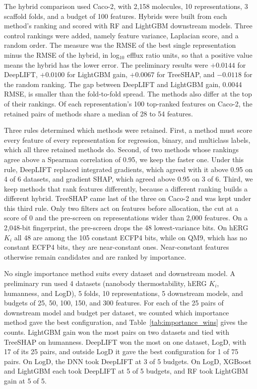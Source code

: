 The hybrid comparison used Caco-2, with 2,158 molecules, 10 representations, 3 scaffold folds, and a budget of 100 features. Hybrids were built from each method's ranking and scored with RF and LightGBM downstream models. Three control rankings were added, namely feature variance, Laplacian score, and a random order. The measure was the RMSE of the best single representation minus the RMSE of the hybrid, in log$_{10}$ efflux ratio units, so that a positive value means the hybrid has the lower error. The preliminary results were $+0.0144$ for DeepLIFT, $+0.0100$ for LightGBM gain, $+0.0067$ for TreeSHAP, and $-0.0118$ for the random ranking. The gap between DeepLIFT and LightGBM gain, 0.0044 RMSE, is smaller than the fold-to-fold spread. The methods also differ at the top of their rankings. Of each representation's 100 top-ranked features on Caco-2, the retained pairs of methods share a median of 28 to 54 features.

Three rules determined which methods were retained. First, a method must score every feature of every representation for regression, binary, and multiclass labels, which all three retained methods do. Second, of two methods whose rankings agree above a Spearman correlation of 0.95, we keep the faster one. Under this rule, DeepLIFT replaced integrated gradients, which agreed with it above 0.95 on 4 of 6 datasets, and gradient SHAP, which agreed above 0.95 on 3 of 6. Third, we keep methods that rank features differently, because a different ranking builds a different hybrid. TreeSHAP came last of the three on Caco-2 and was kept under this third rule. Only two filters act on features before allocation, the cut at a score of 0 and the pre-screen on representations wider than 2,000 features. On a 2,048-bit fingerprint, the pre-screen drops the 48 lowest-variance bits. On hERG $K_i$ all 48 are among the 105 constant ECFP4 bits, while on QM9, which has no constant ECFP4 bits, they are near-constant ones. Near-constant features otherwise remain candidates and are ranked by importance.

No single importance method suits every dataset and downstream model. A preliminary run used 4 datasets (nanobody thermostability, hERG $K_i$, humanness, and LogD), 5 folds, 10 representations, 5 downstream models, and budgets of 25, 50, 100, 150, and 300 features. For each of the 25 pairs of downstream model and budget per dataset, we counted which importance method gave the best configuration, and Table~\ref{tab:importance_wins} gives the counts. LightGBM gain won the most pairs on two datasets and tied with TreeSHAP on humanness. DeepLIFT won the most on one dataset, LogD, with 17 of its 25 pairs, and outside LogD it gave the best configuration for 1 of 75 pairs. On LogD, the DNN took DeepLIFT at 3 of 5 budgets. On LogD, XGBoost and LightGBM each took DeepLIFT at 5 of 5 budgets, and RF took LightGBM gain at 5 of 5.

